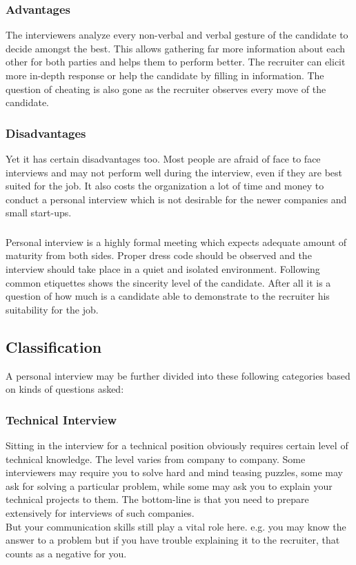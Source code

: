\documentclass[a4paper,12pt]{report}
\begin{document}
\subsubsection{Advantages}
The interviewers analyze every non-verbal
and verbal gesture of the candidate to decide amongst the best. This allows gathering far more information
about each other for both parties and helps them to perform better. The recruiter can elicit more in-depth response
or help the candidate by filling in information. The question of cheating is also gone as the recruiter observes every move
of the candidate.
\subsubsection{Disadvantages}
Yet it has certain disadvantages too. Most people are afraid of face to face interviews and may not perform well
during the interview, even if they are best suited for the job. It also costs the organization a lot of time and
money to conduct a personal interview which is not desirable for the newer companies and small start-ups.
\subsubsection{}
Personal interview is a highly formal meeting which expects adequate amount of  maturity from both sides.
Proper dress code should be observed and the interview should take place in a quiet and isolated environment.
Following common etiquettes shows the sincerity level of the candidate. After all it is a question of how much 
is a candidate able to demonstrate to the recruiter his suitability for the job.
\subsection{Classification}
A personal interview may be further divided into these following categories based on kinds of questions asked:
\subsubsection{Technical Interview}
Sitting in the interview for a technical position obviously requires certain level of technical knowledge. The level
varies from company to company. Some interviewers may require you to solve hard and mind teasing puzzles, some may ask 
for solving a particular problem, while some may ask you to explain your technical projects to them. The bottom-line is
that you need to prepare extensively for interviews of such companies. \\But your communication skills still
play a vital role here. e.g. you may know the answer to a problem but if you have trouble explaining it to the
recruiter, that counts as a negative for you. 
\end{document}
